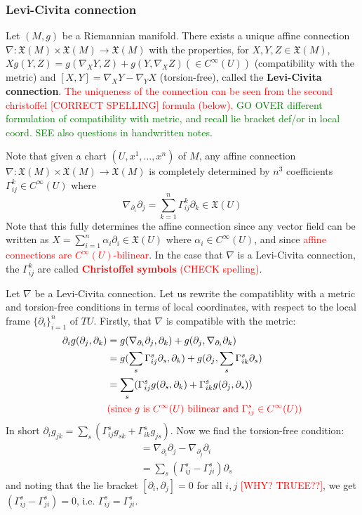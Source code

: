 \documentclass[a4paper]{article}
\theoremstyle{definition} \newtheorem*{definition}{Definition}
\theoremstyle{definition} \newtheorem*{definitions}{Definitions}
\theoremstyle{plain} \newtheorem{theorem}{Theorem}[section]
\theoremstyle{plain} \newtheorem{proposition}[theorem]{Proposition}
\theoremstyle{plain} \newtheorem{corollary}[theorem]{Corollary}
\theoremstyle{plain} \newtheorem{lemma}[theorem]{Lemma}
\theoremstyle{plain} \newtheorem{example}[theorem]{Example}
\newcommand{\checkCorrect}[1]{\textcolor{red}{#1}}
\newcommand{\finish}[1]{\textcolor{green}{#1}}
\newcommand{\defn}[1]{\textbf{#1}}
\begin{document}
\subsubsection{Levi-Civita connection}
Let $(M, g)$ be a Riemannian manifold. There exists a unique affine connection $\nabla:\mathfrak{X}(M)\times \mathfrak{X}(M)\to \mathfrak{X}(M)$ with the properties, for $X,Y,Z\in \mathfrak{X}(M)$,
$Xg(Y,Z)=g(\nabla_XY, Z)+g(Y, \nabla_XZ) (\in C^\infty(U))$ (compatibility with the metric) and $[X,Y]=\nabla_XY-\nabla_YX$ (torsion-free), called the \defn{Levi-Civita connection}. \checkCorrect{The uniqueness of the connection can be seen from the second christoffel [CORRECT SPELLING] formula (below).} \finish{GO OVER different formulation of compatibility with metric, and recall lie bracket def/or in local coord. SEE also questions in handwritten notes}.

Note that given a chart $(U, x^1, \ldots, x^n)$ of $M$, any affine connection $\nabla:\mathfrak{X}(M)\times \mathfrak{X}(M)\to \mathfrak{X}(M)$ is completely determined by $n^3$ coefficients $\Gamma^k_{ij}\in C^\infty (U)$ where
$$\nabla_{\partial_i}\partial_j=\sum_{k=1}^n \Gamma^k_{ij} \partial_k \in \mathfrak{X}(U)$$
Note that this fully determines the affine connection since any vector field can be written as $X=\sum_{i=1}^n \alpha_i \partial_i\in \mathfrak{X}(U)$ where $\alpha_i\in C^\infty (U)$, and since \checkCorrect{affine connections are $C^\infty(U)$-bilinear}. In the case that $\nabla$ is a Levi-Civita connection, the $\Gamma^k_{ij}$ are called \checkCorrect{\defn{Christoffel symbols} (CHECK spelling)}.

Let $\nabla$ be a Levi-Civita connection. Let us rewrite the compatiblity with a metric and torsion-free conditions in terms of local coordinates, with respect to the local frame $\{\partial_i\}_{i=1}^n$ of $TU$. Firstly, that $\nabla$ is compatible with the metric:
\begin{align*}
    \partial_i g(\partial_j, \partial_k) & = g(\nabla_{\partial_i}\partial_j, \partial_k) + g(\partial_j, \nabla_{\partial_i}\partial_k) \\
    & = g(\sum_s \Gamma^s_{ij}\partial_s, \partial_k)+g(\partial_j, \sum_s \Gamma^s_{ik}\partial_s)\\
    &= \sum_s (\Gamma^s_{ij}g(\partial_s, \partial_k)+\Gamma^s_{ik}g(\partial_j, \partial_s)) \\ & \textrm{\checkCorrect{(since $g$ is $C^\infty(U)$ bilinear and $\Gamma^s_{ij}\in C^\infty(U)$)}}
\end{align*}
In short $\partial_i g_{jk} = \sum_s (\Gamma^s_{ij}g_{sk}+\Gamma^s_{ik}g_{js})$. Now we find the torsion-free condition:
\begin{align*}
    [\partial_i, \partial_j] & = \nabla_{\partial_i}\partial_j - \nabla_{\partial_j}\partial_i \\
    & = \sum_s (\Gamma^s_{ij} - \Gamma^s_{ji})\partial_s
\end{align*}
and noting that the lie bracket $[\partial_i, \partial_j]=0$ for all $i,j$ \checkCorrect{[WHY? TRUEE??]}, we get $(\Gamma^s_{ij} - \Gamma^s_{ji})=0$, i.e. $\Gamma^s_{ij}=\Gamma^s_{ji}$.
\end{document}
